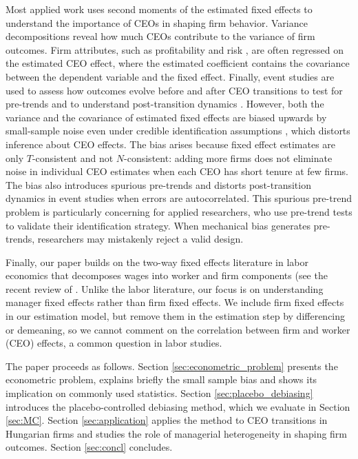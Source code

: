 \documentclass[11pt,a4paper]{article}
\begin{document}
Most applied work uses second moments of the estimated fixed effects to understand the importance of CEOs in shaping firm behavior. Variance decompositions reveal how much CEOs contribute to the variance of firm outcomes. Firm attributes, such as profitability \citep{mackey2008effect} and risk \citep{schoar2024effect}, are often regressed on the estimated CEO effect, where the estimated coefficient contains the covariance between the dependent variable and the fixed effect. Finally, event studies are used to assess how outcomes evolve before and after CEO transitions to test for pre-trends and to understand post-transition dynamics \citep{schoar2024effect}. However, both the variance and the covariance of estimated fixed effects are biased upwards by small-sample noise even under credible identification assumptions
\citep{andrews2008high,gaure2014correlation,bonhomme2023much}, which distorts inference about CEO effects. The bias arises because fixed effect estimates are only $T$-consistent and not $N$-consistent: adding more firms does not eliminate noise in individual CEO estimates when each CEO has short tenure at few firms. The bias also introduces spurious pre-trends and distorts post-transition dynamics in event studies when errors are autocorrelated. This spurious pre-trend problem is particularly concerning for applied researchers, who use pre-trend tests to validate their identification strategy. When mechanical bias generates pre-trends, researchers may mistakenly reject a valid design.

Finally, our paper builds on the two-way fixed effects literature in labor economics that decomposes wages into worker and firm components (see the recent review of \citep{kline2024firm}. Unlike the labor literature, our focus is on understanding manager fixed effects rather than firm fixed effects. We include firm fixed effects in our estimation model, but remove them in the estimation step by differencing or demeaning, so we cannot comment on the correlation between firm and worker (CEO) effects, a common question in labor studies.

The paper proceeds as follows. Section \ref{sec:econometric_problem} presents the econometric problem, explains briefly the small sample bias and shows its implication on commonly used statistics. Section \ref{sec:placebo_debiasing} introduces the placebo-controlled debiasing method, which we evaluate in Section \ref{sec:MC}. Section \ref{sec:application} applies the method to CEO transitions in Hungarian firms and studies the role of managerial heterogeneity in shaping firm outcomes. Section \ref{sec:concl} concludes.
\end{document}
